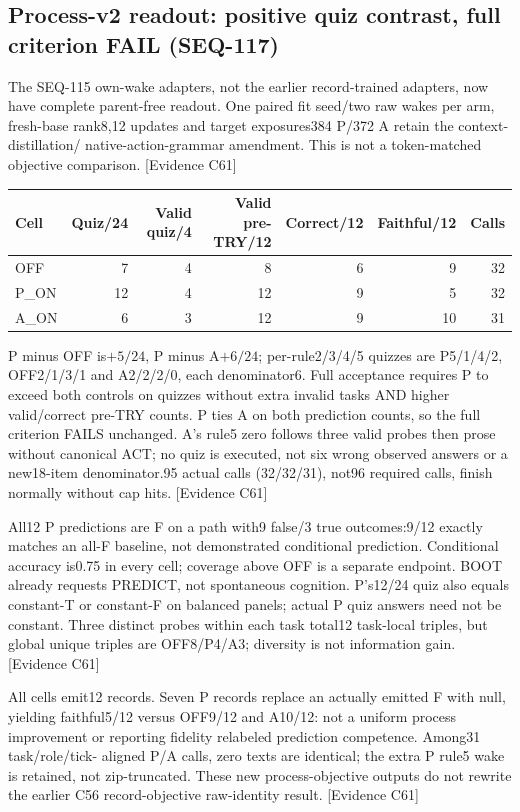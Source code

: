 \documentclass[11pt]{article}
\newcommand{\ev}[1]{\textsf{[Evidence #1]}}
\begin{document}
\subsection{Process-v2 readout: positive quiz contrast, full criterion FAIL (SEQ-117)}
The SEQ-115 own-wake adapters, not the earlier record-trained adapters, now have
complete parent-free readout. One paired fit seed/two raw wakes per arm, fresh-base
rank8,12 updates and target exposures384 P/372 A retain the context-distillation/
native-action-grammar amendment. This is not a token-matched objective comparison.
\ev{C61}

\begin{center}
\begin{tabular}{lrrrrrr}
\toprule
Cell & Quiz/24 & Valid quiz/4 & Valid pre-TRY/12 & Correct/12 & Faithful/12 & Calls \\
\midrule
OFF & 7 & 4 & 8 & 6 & 9 & 32 \\
P\_ON & 12 & 4 & 12 & 9 & 5 & 32 \\
A\_ON & 6 & 3 & 12 & 9 & 10 & 31 \\
\bottomrule
\end{tabular}
\end{center}

P minus OFF is$+5/24$, P minus A$+6/24$; per-rule2/3/4/5 quizzes are
P5/1/4/2, OFF2/1/3/1 and A2/2/2/0, each denominator6. Full acceptance requires
P to exceed both controls on quizzes without extra invalid tasks AND higher
valid/correct pre-TRY counts. P ties A on both prediction counts, so the full
criterion FAILS unchanged. A's rule5 zero follows three valid probes then prose
without canonical ACT; no quiz is executed, not six wrong observed answers or a
new18-item denominator.95 actual calls (32/32/31), not96 required calls, finish
normally without cap hits. \ev{C61}

All12 P predictions are F on a path with9 false/3 true outcomes:9/12 exactly
matches an all-F baseline, not demonstrated conditional prediction. Conditional
accuracy is0.75 in every cell; coverage above OFF is a separate endpoint. BOOT
already requests PREDICT, not spontaneous cognition. P's12/24 quiz also equals
constant-T or constant-F on balanced panels; actual P quiz answers need not be
constant. Three distinct probes within each task total12 task-local triples, but
global unique triples are OFF8/P4/A3; diversity is not information gain. \ev{C61}

All cells emit12 records. Seven P records replace an actually emitted F with null,
yielding faithful5/12 versus OFF9/12 and A10/12: not a uniform process improvement
or reporting fidelity relabeled prediction competence. Among31 task/role/tick-
aligned P/A calls, zero texts are identical; the extra P rule5 wake is retained,
not zip-truncated. These new process-objective outputs do not rewrite the earlier
C56 record-objective raw-identity result. \ev{C61}
\end{document}
